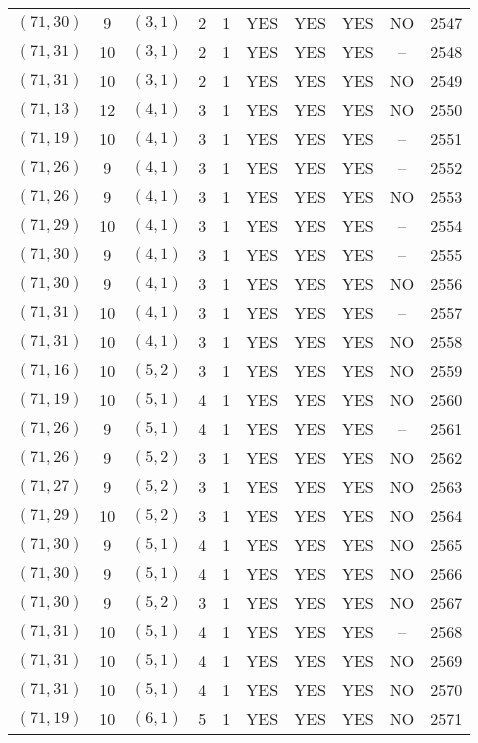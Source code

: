 \begin{longtable}{|c|c|c|c|c|c|c|c|c|c|}
$(71, 30)$ & 9 & $(3, 1)$ & 2 & 1 & YES & YES & YES & NO & 2547\\
$(71, 31)$ & 10 & $(3, 1)$ & 2 & 1 & YES & YES & YES & -- & 2548\\
$(71, 31)$ & 10 & $(3, 1)$ & 2 & 1 & YES & YES & YES & NO & 2549\\
$(71, 13)$ & 12 & $(4, 1)$ & 3 & 1 & YES & YES & YES & NO & 2550\\
$(71, 19)$ & 10 & $(4, 1)$ & 3 & 1 & YES & YES & YES & -- & 2551\\
$(71, 26)$ & 9 & $(4, 1)$ & 3 & 1 & YES & YES & YES & -- & 2552\\
$(71, 26)$ & 9 & $(4, 1)$ & 3 & 1 & YES & YES & YES & NO & 2553\\
$(71, 29)$ & 10 & $(4, 1)$ & 3 & 1 & YES & YES & YES & -- & 2554\\
$(71, 30)$ & 9 & $(4, 1)$ & 3 & 1 & YES & YES & YES & -- & 2555\\
$(71, 30)$ & 9 & $(4, 1)$ & 3 & 1 & YES & YES & YES & NO & 2556\\
$(71, 31)$ & 10 & $(4, 1)$ & 3 & 1 & YES & YES & YES & -- & 2557\\
$(71, 31)$ & 10 & $(4, 1)$ & 3 & 1 & YES & YES & YES & NO & 2558\\
$(71, 16)$ & 10 & $(5, 2)$ & 3 & 1 & YES & YES & YES & NO & 2559\\
$(71, 19)$ & 10 & $(5, 1)$ & 4 & 1 & YES & YES & YES & NO & 2560\\
$(71, 26)$ & 9 & $(5, 1)$ & 4 & 1 & YES & YES & YES & -- & 2561\\
$(71, 26)$ & 9 & $(5, 2)$ & 3 & 1 & YES & YES & YES & NO & 2562\\
$(71, 27)$ & 9 & $(5, 2)$ & 3 & 1 & YES & YES & YES & NO & 2563\\
$(71, 29)$ & 10 & $(5, 2)$ & 3 & 1 & YES & YES & YES & NO & 2564\\
$(71, 30)$ & 9 & $(5, 1)$ & 4 & 1 & YES & YES & YES & NO & 2565\\
$(71, 30)$ & 9 & $(5, 1)$ & 4 & 1 & YES & YES & YES & NO & 2566\\
$(71, 30)$ & 9 & $(5, 2)$ & 3 & 1 & YES & YES & YES & NO & 2567\\
$(71, 31)$ & 10 & $(5, 1)$ & 4 & 1 & YES & YES & YES & -- & 2568\\
$(71, 31)$ & 10 & $(5, 1)$ & 4 & 1 & YES & YES & YES & NO & 2569\\
$(71, 31)$ & 10 & $(5, 1)$ & 4 & 1 & YES & YES & YES & NO & 2570\\
$(71, 19)$ & 10 & $(6, 1)$ & 5 & 1 & YES & YES & YES & NO & 2571\\

\end{longtable}
